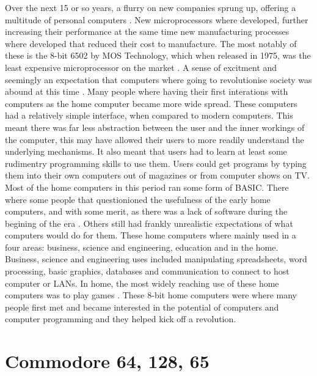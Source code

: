 Over the next 15 or so years, a flurry on new companies sprung up, offering a multitude of personal computers \cite{Micro}. New microprocessors where developed, further increasing their performance at the same time new manufacturing processes where developed that reduced their cost to manufacture. The most notably of these is the 8-bit 6502 by MOS Technology, which when released in 1975, was the least expensive microprocessor on the market \cite{EET75}. A sense of excitment and seemingly an expectation that computers where going to revolutionise society was abound at this time \cite{Cass14}. Many people where having their first interations with computers as the home computer became more wide spread. These computers had a relatively simple interface, when compared to modern computers. This meant there was far less abstraction between the user and the inner workings of the computer, this may have allowed their users to more readily understand the underlying mechanisms. It also meant that users had to learn at least some rudimentry programming skills to use them. Users could get programs by typing them into their own computers out of magazines or from computer shows on TV. Most of the home computers in this period ran some form of BASIC. There where some people that questionioned the usefulness of the early home computers, and with some merit, as there was a lack of software during the begining of the era \cite{Swalwell12}. Others still had frankly unrealistic expectations of what computers would do for them. These home computers where mainly used in a four areas: business, science and engineering, education and in the home. Business, science and engineering uses included manipulating spreadsheets, word processing, basic graphics, databases and communication to connect to host computer or LANs. In home, the most widely reaching use of these home computers was to play games \cite{Gupta84}. These 8-bit home computers were where many people first met and became interested in the potential of computers and computer programming and they helped kick off a revolution.


\section{Commodore 64, 128, 65}
